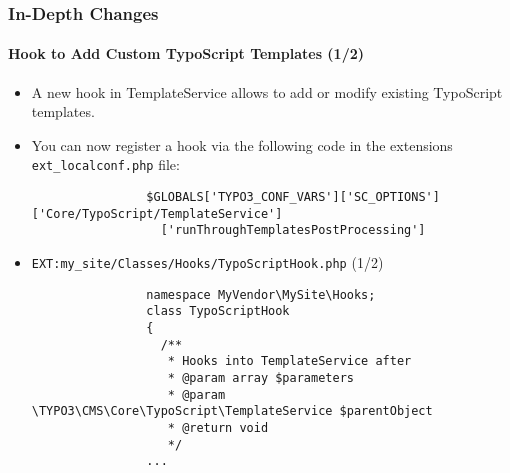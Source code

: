\begin{frame}[fragile]
	\frametitle{In-Depth Changes}
	\framesubtitle{Hook to Add Custom TypoScript Templates (1/2)}

	\lstset{basicstyle=\tiny\ttfamily}

	\begin{itemize}
		\item A new hook in TemplateService allows to add or modify existing TypoScript templates.

		\item You can now register a hook via the following code in the extensions \texttt{ext\_localconf.php} file:

			\begin{lstlisting}
				$GLOBALS['TYPO3_CONF_VARS']['SC_OPTIONS']['Core/TypoScript/TemplateService']
				  ['runThroughTemplatesPostProcessing']
			\end{lstlisting}

		\item \texttt{EXT:my\_site/Classes/Hooks/TypoScriptHook.php} (1/2)

			\begin{lstlisting}
				namespace MyVendor\MySite\Hooks;
				class TypoScriptHook
				{
				  /**
				   * Hooks into TemplateService after
				   * @param array $parameters
				   * @param \TYPO3\CMS\Core\TypoScript\TemplateService $parentObject
				   * @return void
				   */
				...
			\end{lstlisting}

	\end{itemize}

\end{frame}



